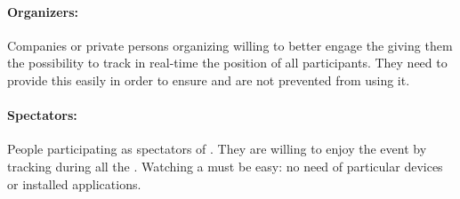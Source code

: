 \documentclass[../../rasd.tex]{subfiles}
\begin{document}
				\paragraph{Organizers:}
				Companies or private persons organizing  willing to better engage the  giving them the possibility to track in real-time the position of all participants. They need to provide this  easily in order to ensure  and  are not prevented from using it.
				\paragraph{Spectators:}
				People participating as spectators of . They are willing to enjoy the event by tracking  during all the \ic{Run}. Watching a  must be easy: no need of particular devices or installed applications.
\end{document}
